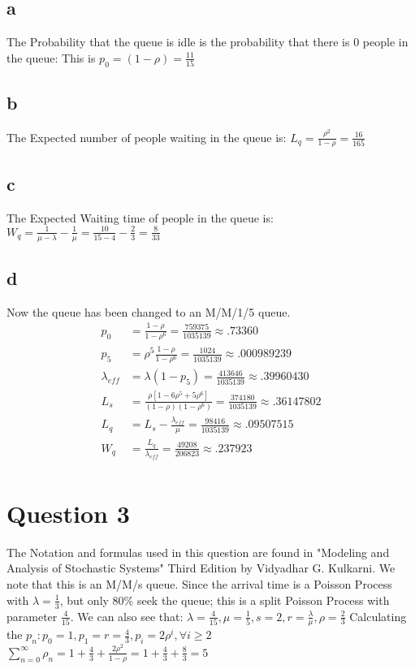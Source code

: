 \documentclass[10pt, letterpaper]{paper}
\begin{document}
\subsection*{a}
The Probability that the queue is idle is the probability that there is 0 people in the queue: This is $p_0 = (1-\rho) = \frac{ 11 }{15}$
\subsection*{b}
The Expected number of people waiting in the queue is: $L_q = \frac{ \rho^2 }{ 1 - \rho } = \frac{ 16}{165}$
\subsection*{c}
The Expected Waiting time of people in the queue is: $W_q = \frac{ 1 }{ \mu - \lambda } - \frac{ 1}{ \mu} = \frac{ 10}{ 15 -4 } - \frac{ 2}{3} = \frac{ 8}{33}$
\subsection*{d}
Now the queue has been changed to an M/M/1/5 queue. 
\begin{align*}
p_0 &	= \frac{ 1 - \rho }{ 1 - \rho^6 } = \frac{ 759375}{1035139} \approx .73360\\
p_5 &= \rho^5 \frac{ 1 - \rho }{ 1 - \rho^6} =\frac{1024}{1035139} \approx  .000989239\\
\lambda_{eff} &= \lambda ( 1 - p_5 ) = \frac{ 413646}{1035139} \approx .39960430\\
L_s &= \frac{ \rho [ 1 - 6\rho^5 + 5\rho^6 ]}{(1-\rho)(1-\rho^6)} = \frac{ 374180}{1035139} \approx .36147802\\
L_q &= L_s - \frac{ \lambda_{eff} }{ \mu } = \frac{ 98416}{1035139} \approx .09507515\\
W_q &= \frac{ L_q }{ \lambda_{eff} } = \frac{ 49208}{206823} \approx .237923\\
\end{align*}

\section*{Question 3}
The Notation and formulas used in this question are found in "Modeling and Analysis of Stochastic Systems" Third Edition by Vidyadhar G. Kulkarni. 
\newline
We note that this is an M/M/s queue. Since the arrival time is a Poisson Process with $\lambda = \frac{1}{3}$, but only 80\% seek the queue; this is a split Poisson Process with parameter $\frac{4}{15}$. We can also see that: $\lambda = \frac{4}{15}, \mu = \frac{1}{5}, s = 2, r = \frac{\lambda}{\mu}, \rho = \frac{2}{3}$
\newline
Calculating the $p_n: p_0 = 1, p_1 = r = \frac{4}{3}, p_i = 2 \rho^i, \forall i \geq 2$
\newline
$\sum_{n=0}^\infty \rho_n = 1 + \frac{4}{3} + \frac{ 2 \rho^2 }{ 1 - \rho } = 1 + \frac{4}{3} + \frac{8}{3} = 5$
\end{document}
